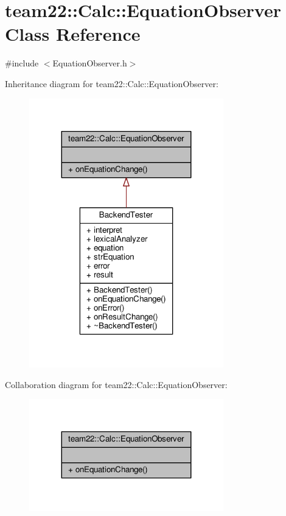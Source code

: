 \hypertarget{classteam22_1_1_calc_1_1_equation_observer}{}\section{team22\+:\+:Calc\+:\+:Equation\+Observer Class Reference}
\label{classteam22_1_1_calc_1_1_equation_observer}


{\ttfamily \#include $<$Equation\+Observer.\+h$>$}



Inheritance diagram for team22\+:\+:Calc\+:\+:Equation\+Observer\+:
\nopagebreak
\begin{figure}[H]
\begin{center}
\leavevmode
\includegraphics[width=239pt]{classteam22_1_1_calc_1_1_equation_observer__inherit__graph}
\end{center}
\end{figure}


Collaboration diagram for team22\+:\+:Calc\+:\+:Equation\+Observer\+:
\nopagebreak
\begin{figure}[H]
\begin{center}
\leavevmode
\includegraphics[width=239pt]{classteam22_1_1_calc_1_1_equation_observer__coll__graph}
\end{center}
\end{figure}
